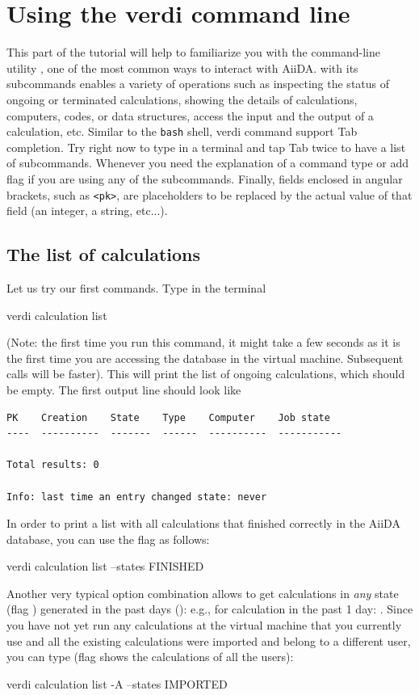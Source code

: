 \section[Verdi command line]{Using the verdi command line}

This part of the tutorial will help to familiarize you with the command-line utility , one of the most common ways to interact with AiiDA.  with its subcommands enables a variety of operations such as inspecting the status of ongoing or terminated calculations, showing the details of calculations, computers, codes, or data structures, access the input and the output of a calculation, etc.  Similar to the \texttt{bash} shell, verdi command support Tab completion. Try right now to type  in a terminal and tap Tab twice to have a list of subcommands. Whenever you need the explanation of a command type  or add  flag if you are using any of the  subcommands. 
Finally, fields enclosed in angular brackets, such as \texttt{<pk>}, are placeholders to be replaced by the actual value of that field (an integer, a string, etc...).

\subsection{The list of calculations}
Let us try our first  commands. Type in the terminal
\begin{bashcommand}
verdi calculation list
\end{bashcommand}
(Note: the first time you run this command, it might take a few seconds as it is the first time you are accessing the database in the virtual machine. Subsequent calls will be faster).
This will print the list of ongoing calculations, which should be empty. The first output line should look like
\begin{verbatim}
PK    Creation    State    Type    Computer    Job state
----  ----------  -------  ------  ----------  -----------

Total results: 0

Info: last time an entry changed state: never
\end{verbatim}

In order to print a list with all calculations that finished correctly in the AiiDA database, you can use the  flag as follows:
\begin{bashcommand}
verdi calculation list --states FINISHED
\end{bashcommand}
Another very typical option combination allows to get calculations in \emph{any} state (flag ) generated in the past  days (): e.g., for calculation in the past 1 day: . Since you have not yet run any calculations at the virtual machine that you currently use and all the existing calculations were imported and belong to a different user, you can type (flag  shows the calculations of all the users):
\begin{bashcommand}
verdi calculation list -A --states IMPORTED
\end{bashcommand}

